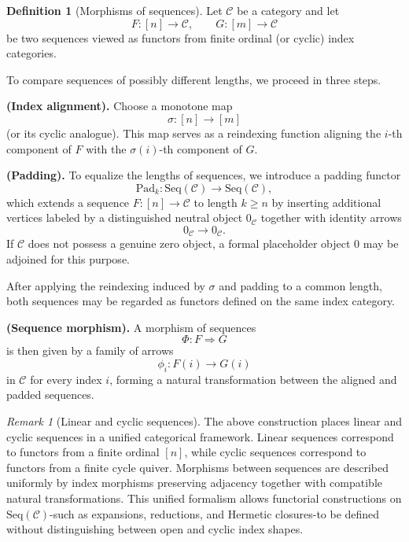 \documentclass[11pt]{book}
\theoremstyle{definition}
\newtheorem{definition}{Definition}[section]
\theoremstyle{plain}
\theoremstyle{remark}
\newtheorem*{remark}{Remark}
\begin{document}
\begin{definition}[Morphisms of sequences]\label{def:seq-morphism}
Let $\mathcal C$ be a category and let
\[
F:[n]\to\mathcal C,\qquad G:[m]\to\mathcal C
\]
be two sequences viewed as functors from finite ordinal (or cyclic) index categories.

To compare sequences of possibly different lengths, we proceed in three steps.

\textbf{(Index alignment).}
Choose a monotone map
\[
\sigma:[n]\to[m]
\]
(or its cyclic analogue).  
This map serves as a reindexing function aligning the $i$-th component of $F$
with the $\sigma(i)$-th component of $G$.

\textbf{(Padding).}
To equalize the lengths of sequences, we introduce a padding functor
\[
\mathrm{Pad}_k:\mathrm{Seq}(\mathcal C)\to\mathrm{Seq}(\mathcal C),
\]
which extends a sequence $F:[n]\to\mathcal C$ to length $k\ge n$
by inserting additional vertices labeled by a distinguished neutral object
$0_{\mathcal C}$ together with identity arrows
\[
0_{\mathcal C}\to 0_{\mathcal C}.
\]
If $\mathcal C$ does not possess a genuine zero object,
a formal placeholder object $0$ may be adjoined for this purpose.

After applying the reindexing induced by $\sigma$ and padding to a common
length, both sequences may be regarded as functors defined on the same
index category.

\textbf{(Sequence morphism).}
A morphism of sequences
\[
\Phi:F\Rightarrow G
\]
is then given by a family of arrows
\[
\phi_i:F(i)\to G(i)
\]
in $\mathcal C$ for every index $i$, forming a natural transformation
between the aligned and padded sequences.

\end{definition}


\begin{remark}[Linear and cyclic sequences]\label{rem:linear-cyclic}
The above construction places linear and cyclic sequences in a unified
categorical framework.  
Linear sequences correspond to functors from a finite ordinal $[n]$,
while cyclic sequences correspond to functors from a finite cycle quiver.
Morphisms between sequences are described uniformly by index morphisms
preserving adjacency together with compatible natural transformations.
This unified formalism allows functorial constructions on
$\mathrm{Seq}(\mathcal C)$-such as expansions, reductions,
and Hermetic closures-to be defined without distinguishing
between open and cyclic index shapes.
\end{remark}
\end{document}
